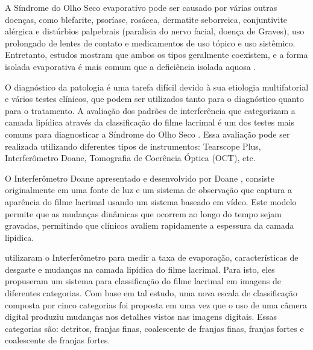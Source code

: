 A Síndrome do Olho Seco evaporativo pode ser causado por várias outras doenças, como blefarite, psoríase, rosácea, dermatite seborreica, conjuntivite alérgica e distúrbios palpebrais (paralisia do nervo facial, doença de Graves), uso prolongado de lentes de contato e medicamentos de uso tópico e uso sistêmico. Entretanto, estudos mostram que ambos os tipos geralmente coexistem, e a forma isolada evaporativa é mais comum que a deficiência isolada aquosa \cite{dry2007definition, lemp2012distribution, fonseca2010olho}.

O diagnóstico da patologia é uma tarefa difícil devido à sua etiologia multifatorial e vários testes clínicos, que podem ser utilizados tanto para o diagnóstico quanto para o tratamento. A avaliação dos padrões de interferência que categorizam a camada lipídica através da classificação do filme lacrimal é um dos testes mais comuns para diagnosticar a Síndrome do Olho Seco \cite{GUILLON1998S31}. Essa avaliação pode ser realizada utilizando diferentes tipos de instrumentos: Tearscope Plus, Interferômetro Doane, Tomografia de Coerência Óptica (OCT), etc.


O Interferômetro Doane apresentado e desenvolvido por Doane \cite{doane1989instrument}, consiste originalmente em uma fonte de luz e um sistema de observação que captura a aparência do filme lacrimal usando um sistema baseado em vídeo. Este modelo permite que as mudanças dinâmicas que ocorrem ao longo do tempo sejam gravadas, permitindo que clínicos avaliem rapidamente a espessura da camada lipídica.

 utilizaram o Interferômetro para medir a taxa de evaporação, características de desgaste e mudanças na camada lipídica do filme lacrimal. Para isto, eles propuseram um sistema para classificação do filme lacrimal em imagens de diferentes categorias. Com base em tal estudo, uma nova escala de classificação composta por cinco categorias foi proposta em \cite{remeseiro2015automatic} uma vez que o uso de uma câmera digital produziu mudanças nos detalhes vistos nas imagens digitais. Essas categorias são: detritos, franjas finas, coalescente de franjas finas, franjas fortes e coalescente de franjas fortes.

